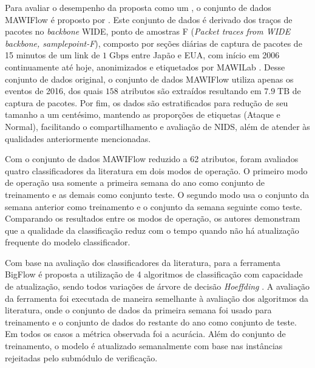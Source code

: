 Para avaliar o desempenho da proposta como um \nids, o conjunto de dados
MAWIFlow é proposto por .
Este conjunto de dados é derivado dos traços de pacotes no \emph{backbone} WIDE, ponto de amostras F
(\emph{Packet traces from WIDE backbone, samplepoint-F}), composto por
seções diárias de captura de pacotes de 15 minutos de um link de $1\;
\mathrm{Gbps}$ entre Japão e EUA, com início em 2006 continuamente até hoje,
anonimizados e etiquetados por MAWILab \cite{mawiSamplepointF,Fontugne2010}.
Desse conjunto de dados original, o conjunto de dados MAWIFlow utiliza apenas os eventos de 2016,
dos quais $158$ atributos são extraídos resultando em $7.9\;\mathrm{TB}$ de captura de pacotes.
Por fim, os dados são estratificados para redução de seu tamanho a um
centésimo, mantendo as proporções de etiquetas (Ataque e Normal), facilitando o
compartilhamento e avaliação de NIDS, além de atender às qualidades anteriormente
mencionadas.


Com o conjunto de dados MAWIFlow reduzido a 62 atributos, foram avaliados quatro
classificadores da literatura em dois modos de operação.
O primeiro modo de operação usa somente a primeira semana do ano como conjunto
de treinamento e as demais como conjunto teste.
O segundo modo usa o conjunto da semana anterior como treinamento e o
conjunto da semana seguinte como teste.
Comparando os resultados entre os modos de operação, os autores demonstram que a qualidade da
classificação reduz com o tempo quando não há atualização frequente do modelo
classificador.

Com base na avaliação dos classificadores da literatura, para a ferramenta
BigFlow é proposta a utilização de 4 algoritmos de classificação com capacidade
de atualização, sendo todos variações de árvore de decisão
\emph{Hoeffding} \cite{Viegas2019,Domingos2000}.
A avaliação da ferramenta foi executada de maneira semelhante à avaliação
dos algoritmos da literatura, onde o conjunto de dados da primeira semana foi
usado para treinamento e o conjunto de dados do restante do ano como conjunto
de teste. Em todos os casos a métrica observada foi a acurácia.
Além do conjunto de treinamento, o modelo é atualizado semanalmente com base nas
instâncias rejeitadas pelo submódulo de verificação. 

